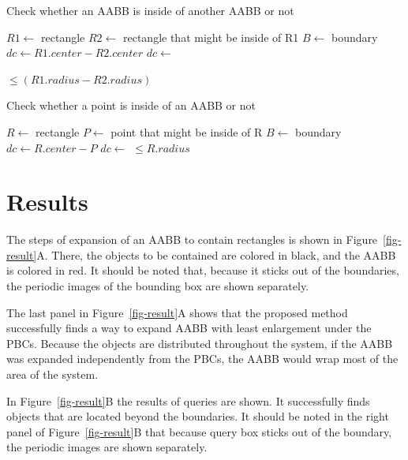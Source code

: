 \documentclass[10pt,letterpaper,twocolumn]{article}
\begin{document}
\begin{algorithm}[tb]
    \caption{Check whether an AABB is inside of another AABB or not}
    \label{aabb_within_aabb}
    \begin{algorithmic}
        \State $R1 \gets$ rectangle
        \State $R2 \gets$ rectangle that might be inside of R1
        \State $B  \gets$ boundary
            \State $dc \gets R1.center - R2.center$
            \State $dc \gets$ 

            \State \Return {} $\leq (R1.radius - R2.radius)$
        \EndFunction
     \end{algorithmic}
\end{algorithm}

\begin{algorithm}[tb]
    \caption{Check whether a point is inside of an AABB or not}
    \label{point_within_aabb}
    \begin{algorithmic}
        \State $R \gets$ rectangle
        \State $P \gets$ point that might be inside of R
        \State $B \gets$ boundary
            \State $dc \gets R.center - P$
            \State $dc \gets$ 
            \State \Return {} $\leq R.radius$
        \EndFunction
     \end{algorithmic}
\end{algorithm}

\section*{Results}

The steps of expansion of an AABB to contain rectangles is shown in
Figure~\ref{fig-result}A. There, the objects to be contained are colored
in black, and the AABB is colored in red.
It should be noted that, because it sticks out of the boundaries,
the periodic images of the bounding box are shown separately.

The last panel in Figure~\ref{fig-result}A shows that the proposed method
successfully finds a way to expand AABB with least enlargement under the PBCs.
Because the objects are distributed throughout the system,
if the AABB was expanded independently from the PBCs,
the AABB would wrap most of the area of the system.

In Figure~\ref{fig-result}B the results of queries are shown. It successfully
finds objects that are located beyond the boundaries. It should be noted
in the right panel of Figure~\ref{fig-result}B that because query box sticks out
of the boundary, the periodic images are shown separately.
\end{document}
